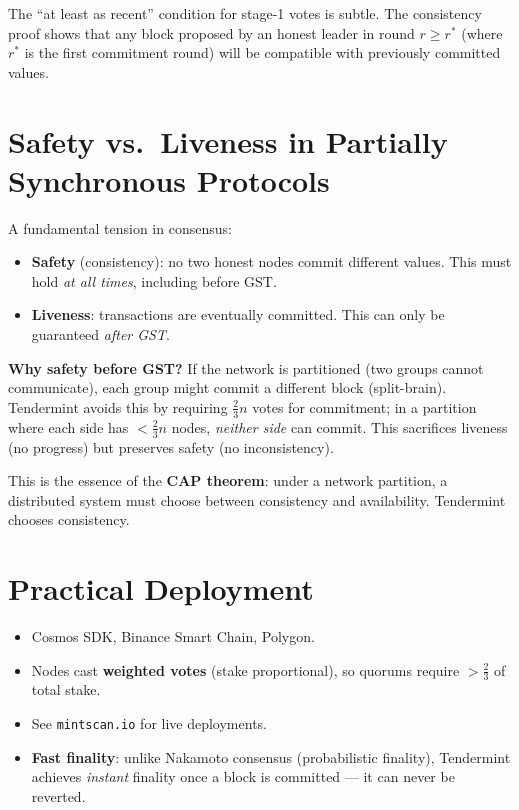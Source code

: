\documentclass[12pt,a4paper,openany]{book}
\theoremstyle{definition}
\theoremstyle{plain}
\theoremstyle{remark}
\begin{document}
The ``at least as recent'' condition for stage-1 votes is subtle.  The
consistency proof shows that any block proposed by an honest leader in
round $r \geq r^*$ (where $r^*$ is the first commitment round) will be
compatible with previously committed values.

\section{Safety vs.\ Liveness in Partially Synchronous Protocols}

A fundamental tension in consensus:
\begin{itemize}
  \item \textbf{Safety} (consistency): no two honest nodes commit
        different values.  This must hold \emph{at all times}, including
        before GST.
  \item \textbf{Liveness}: transactions are eventually committed.  This
        can only be guaranteed \emph{after GST}.
\end{itemize}

\textbf{Why safety before GST?}  If the network is partitioned (two
groups cannot communicate), each group might commit a different block
(split-brain).  Tendermint avoids this by requiring $\frac{2}{3}n$
votes for commitment; in a partition where each side has $< \frac{2}{3}n$
nodes, \emph{neither side} can commit.  This sacrifices liveness
(no progress) but preserves safety (no inconsistency).

This is the essence of the \textbf{CAP theorem}: under a network
partition, a distributed system must choose between consistency and
availability.  Tendermint chooses consistency.

\section{Practical Deployment}

\begin{itemize}
  \item Cosmos SDK, Binance Smart Chain, Polygon.
  \item Nodes cast \textbf{weighted votes} (stake proportional), so
        quorums require $>\frac{2}{3}$ of total stake.
  \item See \texttt{mintscan.io} for live deployments.
  \item \textbf{Fast finality}: unlike Nakamoto consensus (probabilistic
        finality), Tendermint achieves \emph{instant} finality once a
        block is committed — it can never be reverted.
\end{itemize}
\end{document}
